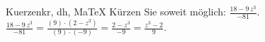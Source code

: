 \begin{MAufgabe}{Kuerzen}{kr, dh, MaTeX}
K\"urzen Sie soweit m\"oglich: $\frac{18 - 9\, z^3}{-81}$.\\ 
\ifLsg\MLoesung
\quad $\frac{18 - 9\, z^3}{-81}=\frac{(9)\cdot(2 - z^3)}{(9)\cdot(-9)}=\frac{2 - z^3}{-9}=\frac{z^3 - 2}{9}$.\else\relax\fi
 \end{MAufgabe}